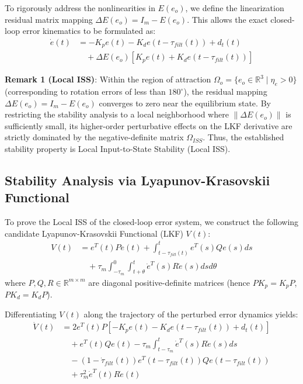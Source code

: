 \documentclass[letterpaper,journal]{IEEEtran}
\begin{document}
To rigorously address the nonlinearities in $E(e_o)$, we define the linearization residual matrix mapping $\Delta E(e_o) = I_m - E(e_o)$. This allows the exact closed-loop error kinematics to be formulated as:
\begin{equation}
\begin{split}
\dot{e}(t) &= -K_p e(t) - K_d e(t - \tau_{filt}(t)) + d_t(t) \\
&\quad + \Delta E(e_o) \left[ K_p e(t) + K_d e(t - \tau_{filt}(t)) \right]
\end{split}
\end{equation}

\textbf{Remark 1 (Local ISS)}: Within the region of attraction $\Omega_o = \{ e_o \in \mathbb{R}^3 \mid \eta_e > 0 \}$ (corresponding to rotation errors of less than $180^\circ$), the residual mapping $\Delta E(e_o) = I_m - E(e_o)$ converges to zero near the equilibrium state. By restricting the stability analysis to a local neighborhood where $\|\Delta E(e_o)\|$ is sufficiently small, its higher-order perturbative effects on the LKF derivative are strictly dominated by the negative-definite matrix $\Omega_{ISS}$. Thus, the established stability property is Local Input-to-State Stability (Local ISS).

\subsection{Stability Analysis via Lyapunov-Krasovskii Functional}
To prove the Local ISS of the closed-loop error system, we construct the following candidate Lyapunov-Krasovskii Functional (LKF) $V(t)$:
\begin{equation}
\begin{split}
V(t) &= e^T(t) P e(t) + \int_{t - \tau_{filt}(t)}^{t} e^T(s) Q e(s) ds \\
&\quad + \tau_m \int_{-\tau_m}^{0} \int_{t + \theta}^{t} \dot{e}^T(s) R \dot{e}(s) ds d\theta
\end{split}
\end{equation}
where $P, Q, R \in \mathbb{R}^{m \times m}$ are diagonal positive-definite matrices (hence $P K_p = K_p P$, $P K_d = K_d P$).

Differentiating $V(t)$ along the trajectory of the perturbed error dynamics yields:
\begin{equation}
\begin{split}
\dot{V}(t) &= 2 e^T(t) P \left[ -K_p e(t) - K_d e(t - \tau_{filt}(t)) + d_t(t) \right] \\
&\quad + e^T(t) Q e(t) - \tau_m \int_{t - \tau_m}^{t} \dot{e}^T(s) R \dot{e}(s) ds \\
&\quad - (1 - \dot{\tau}_{filt}(t)) e^T(t - \tau_{filt}(t)) Q e(t - \tau_{filt}(t)) \\
&\quad + \tau_m^2 \dot{e}^T(t) R \dot{e}(t)
\end{split}
\end{equation}
\end{document}
